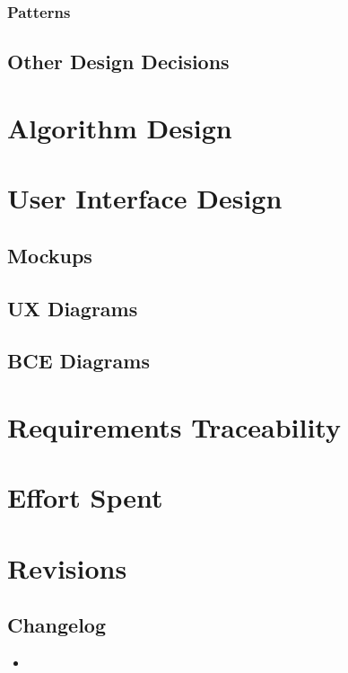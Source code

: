 \documentclass[english]{article}
\begin{document}
\subsubsection{Patterns}

\subsection{Other Design Decisions}

\newpage

\section{Algorithm Design}

	
\makebox[14cm][c]{
	
}

\newpage

\makebox[14cm][c]{
	
}


\newpage

\section{User Interface Design}

\subsection{Mockups}

\subsection{UX Diagrams}

\subsection{BCE Diagrams}

\newpage

\section{Requirements Traceability}

\newpage

\section{Effort Spent}

\newpage

\section{Revisions}

\subsection{Changelog}
\begin{itemize}
  \item{}
\end{itemize}
\end{document}
